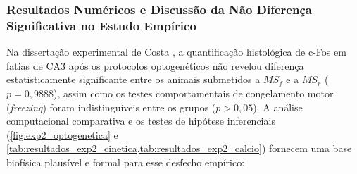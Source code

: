 \documentclass[11pt,a4paper,article,brazil]{abntex2}
\begin{document}
\subsubsection{Resultados Numéricos e Discussão da Não Diferença Significativa no Estudo Empírico}
Na dissertação experimental de Costa \cite{costa2026}, a quantificação histológica de c-Fos em fatias de CA3 após os protocolos optogenéticos não revelou diferença estatisticamente significante entre os animais submetidos a $MS_f$ e a $MS_r$ ($p = 0{,}9888$), assim como os testes comportamentais de congelamento motor (\emph{freezing}) foram indistinguíveis entre os grupos ($p > 0{,}05$). A análise computacional comparativa e os testes de hipótese inferenciais (\cref{fig:exp2_optogenetica} e \cref{tab:resultados_exp2_cinetica,tab:resultados_exp2_calcio}) fornecem uma base biofísica plausível e formal para esse desfecho empírico:
\end{document}
